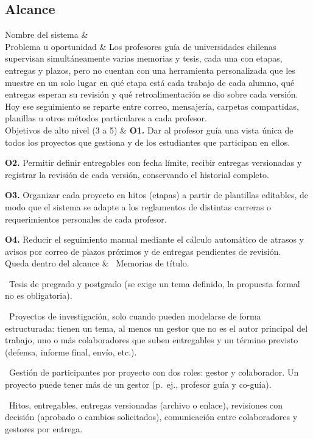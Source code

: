 \documentclass[10pt,a4paper]{article}
\newcommand{\nota}[1]{{\small\itshape\color{nota}#1\par}}
\newenvironment{kv}[1][4.6cm]
  {\footnotesize\setlength{\extrarowheight}{3pt}\xltabular{\linewidth}{|E{#1}|L|}\hline}
  {\endxltabular}
\newcommand{\kvrow}[2]{#1 & #2 \\ \hline}
\begin{document}
\subsection{Alcance}
\begin{kv}
\kvrow{Nombre del sistema}{\sistema{}}
\kvrow{Problema u oportunidad}{Los profesores guía de universidades chilenas supervisan simultáneamente varias memorias y tesis, cada una con etapas, entregas y plazos, pero no cuentan con una herramienta personalizada que les muestre en un solo lugar en qué etapa está cada trabajo de cada alumno, qué entregas esperan su revisión y qué retroalimentación se dio sobre cada versión. Hoy ese seguimiento se reparte entre correo, mensajería, carpetas compartidas, planillas u otros métodos particulares a cada profesor.}
\kvrow{Objetivos de alto nivel (3 a 5)}{%
\textbf{O1.} Dar al profesor guía una vista única de todos los proyectos que gestiona y de los estudiantes que participan en ellos.\par
\textbf{O2.} Permitir definir entregables con fecha límite, recibir entregas versionadas y registrar la revisión de cada versión, conservando el historial completo.\par
\textbf{O3.} Organizar cada proyecto en hitos (etapas) a partir de plantillas editables, de modo que el sistema se adapte a los reglamentos de distintas carreras o requerimientos personales de cada profesor.\par
\textbf{O4.} Reducir el seguimiento manual mediante el cálculo automático de atrasos y avisos por correo de plazos próximos y de entregas pendientes de revisión.}
\kvrow{Queda dentro del alcance}{%
\textbullet~Memorias de título.\par
\textbullet~Tesis de pregrado y postgrado (se exige un tema definido, la propuesta formal no es obligatoria).\par
\textbullet~Proyectos de investigación, solo cuando pueden modelarse de forma estructurada: tienen un tema, al menos un gestor que no es el autor principal del trabajo, uno o más colaboradores que suben entregables y un término previsto (defensa, informe final, envío, etc.).\par
\textbullet~Gestión de participantes por proyecto con dos roles: gestor y colaborador. Un proyecto puede tener más de un gestor (p.~ej., profesor guía y co-guía).\par
\textbullet~Hitos, entregables, entregas versionadas (archivo o enlace), revisiones con decisión (aprobado o cambios solicitados), comunicación entre colaboradores y gestores por entrega.\par
}
\end{kv}
\end{document}
